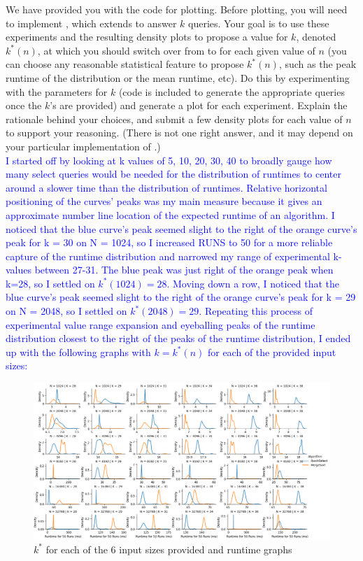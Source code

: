 \documentclass[11pt]{article}
\begin{document}
\begin{enumerate}
\begin{enumerate}
        We have provided you with the code for plotting. Before plotting, you will need to implement \MergeSortSelect{}, which extends \MergeSort{} to answer $k$ queries. Your goal is to use these experiments and the resulting density plots to propose a value for $k$, denoted $k^*(n)$, at which you should switch over from \QuickSelect{} to \MergeSortSelect{} for each given value of $n$ (you can choose any reasonable statistical feature to propose $k^*(n)$, such as the peak runtime of the distribution or the mean runtime, etc). Do this by experimenting with the parameters for $k$ (code is included to generate the appropriate queries once the $k$'s are provided) and generate a plot for each experiment.  Explain the rationale behind your choices, and submit a few density plots for each value of $n$ to support your reasoning.  (There is not one right answer, and it may depend on your particular implementation of \QuickSelect{}.) \\
        
\textcolor{blue}{
I started off by looking at k values of 5, 10, 20, 30, 40 to broadly gauge how many select queries would be needed for the distribution of \QuickSelect{} runtimes to center around a slower time than the distribution of \MergeSortSelect{} runtimes. Relative horizontal positioning of the curves' peaks was my main measure because it gives an approximate number line location of the expected runtime of an algorithm. I noticed that the blue curve's peak seemed slight to the right of the orange curve's peak for k = 30 on N = 1024, so I increased RUNS to 50 for a more reliable capture of the runtime distribution and narrowed my range of experimental k-values between 27-31. The blue peak was just right of the orange peak when k=28, so I settled on $k^*(1024)=28$. Moving down a row, I noticed that the blue curve's peak seemed slight to the right of the orange curve's peak for k = 29 on N = 2048, so I settled on $k^*(2048)=29$. Repeating this process of experimental value range expansion and eyeballing peaks of the \QuickSelect{} runtime distribution closest to the right of the peaks of the \MergeSortSelect{}{} runtime distribution, I ended up with the following graphs with $k = k^*(n)$ for each of the provided input sizes:
}

\begin{figure}[H]
    \centering
    \includegraphics[width=1.1\linewidth]{PS4-1b.png}
    \caption{$k^*$ for each of the 6 input sizes provided and runtime graphs}
\end{figure}


\end{enumerate}
\end{enumerate}
\end{document}
